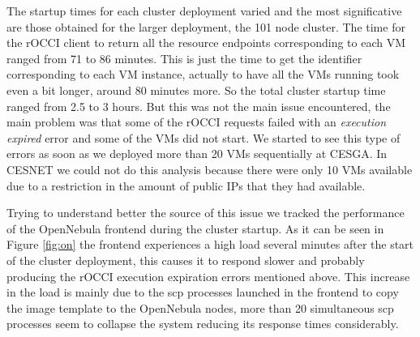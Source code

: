 \documentclass[oribibl]{llncs_Ibergrid2013}
\begin{document}
The startup times for each cluster deployment varied and the most significative are those obtained for the larger deployment, the 101 node cluster. The time for the rOCCI client to return all the resource endpoints corresponding to each VM ranged from 71 to 86 minutes. This is just the time to get the identifier corresponding to each VM instance, actually to have all the VMs running took even a bit longer, around 80 minutes more. So the total cluster startup time ranged from 2.5 to 3 hours. But this was not the main issue encountered, the main problem was that some of the rOCCI requests failed with an \emph{execution expired} error and some of the VMs did not start.
We started to see this type of errors as soon as we deployed more than 20 VMs sequentially at CESGA. In CESNET we could not do this analysis because there were only 10 VMs available due to a restriction in the amount of public IPs that they had available.

Trying to understand better the source of this issue we tracked the performance of the OpenNebula frontend during the cluster startup. As it can be seen in Figure \ref{fig:on} the frontend experiences a high load several minutes after the start of the cluster deployment, this causes it to respond slower and probably producing the rOCCI execution expiration errors mentioned above. This increase in the load is mainly due to the scp processes launched in the frontend to copy the image template to the OpenNebula nodes, more than 20 simultaneous scp processes seem to collapse the system reducing its response times considerably.

%
%
%
%
\end{document}
